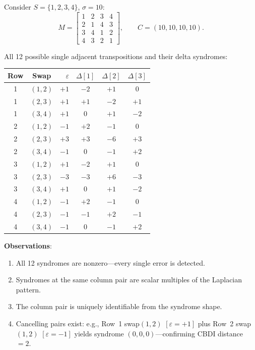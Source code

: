 \documentclass[11pt]{article}
\begin{document}
Consider $S = \{1,2,3,4\}$, $\sigma = 10$:
\[
M = \begin{bmatrix}
1 & 2 & 3 & 4 \\
2 & 1 & 4 & 3 \\
3 & 4 & 1 & 2 \\
4 & 3 & 2 & 1
\end{bmatrix}, \qquad C = (10, 10, 10, 10).
\]

All 12 possible single adjacent transpositions and their delta syndromes:

\begin{center}
\renewcommand{\arraystretch}{1.15}
\begin{tabular}{ccrccc}
\toprule
Row & Swap & $\varepsilon$ & $\Delta[1]$ & $\Delta[2]$ & $\Delta[3]$ \\
\midrule
1 & $(1,2)$ & $+1$ & $-2$ & $+1$ & $0$ \\
1 & $(2,3)$ & $+1$ & $+1$ & $-2$ & $+1$ \\
1 & $(3,4)$ & $+1$ & $0$ & $+1$ & $-2$ \\
2 & $(1,2)$ & $-1$ & $+2$ & $-1$ & $0$ \\
2 & $(2,3)$ & $+3$ & $+3$ & $-6$ & $+3$ \\
2 & $(3,4)$ & $-1$ & $0$ & $-1$ & $+2$ \\
3 & $(1,2)$ & $+1$ & $-2$ & $+1$ & $0$ \\
3 & $(2,3)$ & $-3$ & $-3$ & $+6$ & $-3$ \\
3 & $(3,4)$ & $+1$ & $0$ & $+1$ & $-2$ \\
4 & $(1,2)$ & $-1$ & $+2$ & $-1$ & $0$ \\
4 & $(2,3)$ & $-1$ & $-1$ & $+2$ & $-1$ \\
4 & $(3,4)$ & $-1$ & $0$ & $-1$ & $+2$ \\
\bottomrule
\end{tabular}
\end{center}

\textbf{Observations}:
\begin{enumerate}
\item All 12 syndromes are nonzero---every single error is detected.
\item Syndromes at the same column pair are scalar multiples of the Laplacian pattern.
\item The column pair is uniquely identifiable from the syndrome shape.
\item Cancelling pairs exist: e.g., Row~1 swap$(1,2)$ $[\varepsilon=+1]$ plus Row~2 swap$(1,2)$ $[\varepsilon=-1]$ yields syndrome $(0,0,0)$---confirming CBDI distance~$= 2$.
\end{enumerate}
\end{document}
